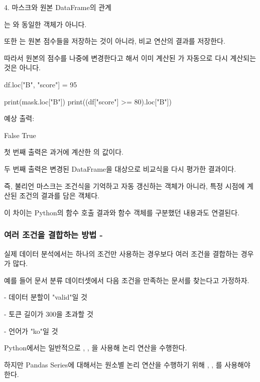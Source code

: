 \begin{dhknote}
\begin{dhksmry}[centered]
4. 마스크와 원본 DataFrame의 관계
\end{dhksmry}
\end{dhknote}

는 와 동일한 객체가 아니다.

또한 는 원본 점수들을 저장하는 것이 아니라, 비교 연산의 결과를 저장한다.

따라서 원본의 점수를 나중에 변경한다고 해서 이미 계산된 가 자동으로 다시 계산되는 것은 아니다.

\begin{dhkcode}
df.loc["B", "score"] = 95

print(mask.loc["B"])
print((df["score"] >= 80).loc["B"])
\end{dhkcode}

예상 출력:

\begin{dhkzsh}
False
True
\end{dhkzsh}

첫 번째 출력은 과거에 계산한 의 값이다.

두 번째 출력은 변경된 DataFrame을 대상으로 비교식을 다시 평가한 결과이다.

즉, 불리언 마스크는 조건식을 기억하고 자동 갱신하는 객체가 아니라, 특정 시점에 계산된 조건의 결과를 담은 객체다.

이 차이는 Python의 함수 호출 결과와 함수 객체를 구분했던 내용과도 연결된다.

\subsubsection{여러 조건을 결합하는 방법 - \zsh{&, |, ~}}

실제 데이터 분석에서는 하나의 조건만 사용하는 경우보다 여러 조건을 결합하는 경우가 많다.

예를 들어 문서 분류 데이터셋에서 다음 조건을 만족하는 문서를 찾는다고 가정하자.

\begin{dhksmry}
    - 데이터 분할이 "valid"일 것

    - 토큰 길이가 300을 초과할 것

    - 언어가 "ko"일 것
\end{dhksmry}

Python에서는 일반적으로 , , 을 사용해 논리 연산을 수행한다.

하지만 Pandas Series에 대해서는 원소별 논리 연산을 수행하기 위해 \zsh{&}, \zsh{|}, \zsh{~}를 사용해야 한다.

